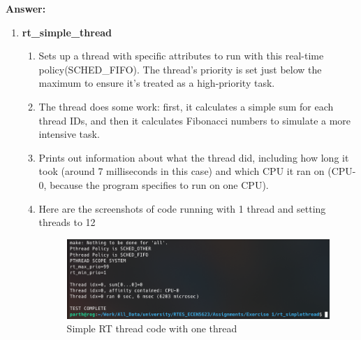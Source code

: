 \documentclass[a4paper,11pt]{article}%
\newenvironment{qanda}{\setlength{\parindent}{0pt}}{\bigskip}
\newcommand{\A}{\par\textbf{Answer: } \normalfont}
\begin{document}
\begin{qanda}
\begin{enumerate}
\begin{enumerate}
				\A \begin{enumerate}
					\item \textbf{rt\_simple\_thread}
					\begin{enumerate}
						\item Sets up a thread with specific attributes to run with this real-time policy(SCHED\_FIFO). The thread's priority is set just below the maximum to ensure it's treated as a high-priority task. 
						\item The thread does some work: first, it calculates a simple sum for each thread IDs, and then it calculates Fibonacci numbers to simulate a more intensive task.
						\item Prints out information about what the thread did, including how long it took (around 7 milliseconds in this case) and which CPU it ran on (CPU-0, because the program specifies to run on one CPU).
						\item Here are the screenshots of code running with 1 thread and setting threads to 12
						\begin{figure}[H]
							\centering
							\includegraphics[scale=0.5]{figures/simple_rt_thread.png}
							\caption{Simple RT thread code with one thread}
							\label{rm}
						\end{figure}
						\begin{figure}[H]
							\centering

\end{figure}
\end{enumerate}
\end{enumerate}
\end{enumerate}
\end{enumerate}
\end{qanda}
\end{document}
